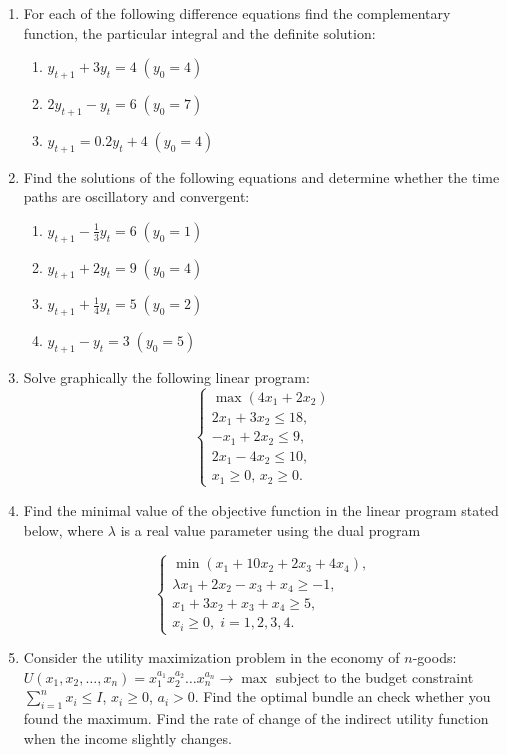 \documentclass[12pt]{article} %
\theoremstyle{definition} %
\begin{document}
\begin{enumerate}
\item For each of the following difference equations find the complementary function, the particular integral and the definite solution:

\begin{enumerate}
\item $y_{t+1}+3y_t=4\; (y_0=4)$
\item $2y_{t+1}-y_t=6\; (y_0=7)$
\item $y_{t+1}=0.2y_t+4\; (y_0=4)$
\end{enumerate}

\item Find the solutions of the following equations and determine whether the time paths are oscillatory and convergent:
\begin{enumerate}
\item $y_{t+1}-\frac13y_t=6\; (y_0=1)$
\item $y_{t+1}+2y_t=9\; (y_0=4)$
\item $y_{t+1}+\frac14y_t=5\; (y_0=2)$
\item $y_{t+1}-y_t=3\; (y_0=5)$
\end{enumerate}

\item Solve graphically the following linear program:
\[
\begin{cases}
\max (4x_1+2x_2)\\
2x_1+3x_2\leqslant 18,\\
-x_1+2x_2\leqslant 9,\\
2x_1-4x_2\leqslant 10,\\
x_1\geqslant 0,\, x_2\geqslant 0.
\end{cases}
\]

\item Find the minimal value of the objective function in the linear program stated below, where $\lambda$ is a real value parameter using the dual program

\[
\begin{cases}
\min  (x_1+10 x_2+2x_3+4x_4),\\
\lambda x_1+2x_2-x_3+x_4\geqslant -1,\\
x_1+3x_2+x_3+x_4\geqslant 5,\\
x_i\geqslant 0,\; i=1,2,3,4.
\end{cases}
\]

\item Consider the utility maximization problem in the economy of $n$-goods:\\ $U(x_1,x_2,\dots, x_n)=x_1^{a_1}x_2^{a_2}\dots x_n^{a_n}\rightarrow \max $ subject to the budget constraint $\sum\limits_{i=1}^nx_i\leqslant I$, $x_i\geqslant 0$, $a_i>0$.
Find the optimal bundle an check whether you found the maximum. Find the rate of change of the indirect utility function when the income slightly changes.
\end{enumerate}
\end{document}
